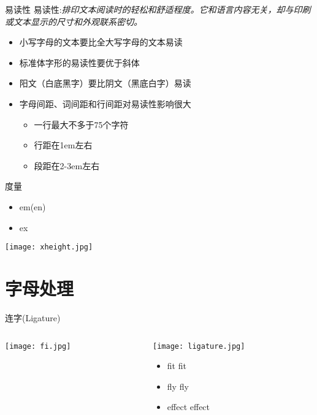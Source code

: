 ﻿\documentclass[hyperref={bookmarks=true},xcolor=pdflatex,svgnames,table,compress]{beamer}
\begin{document}
\begin{frame}{易读性}
  易读性:{\em 排印文本阅读时的轻松和舒适程度。它和语言内容无关，却与印刷或文本显示的尺寸和外观联系密切。}

  \begin{itemize}
  \item<1-> 小写字母的文本要比全大写字母的文本易读
  \item<1-> 标准体字形的易读性要优于斜体
  \item<1-> 阳文（白底黑字）要比阴文（黑底白字）易读
  \item<2-> 字母间距、词间距和行间距对易读性影响很大
    \begin{itemize}
    \item 一行最大不多于75个字符
    \item 行距在1em左右
    \item 段距在2-3em左右
    \end{itemize}
  \end{itemize}

\end{frame}

\begin{frame}{度量}

  \begin{itemize}
  \item em(en)
  \item ex
  \end{itemize}

  \texttt{[image: xheight.jpg]}
\end{frame}

\section{字母处理}
\begin{frame}{连字(Ligature)}
  \begin{columns}[c]

    \begin{column}{0.2\textwidth}

      \texttt{[image: fi.jpg]}

    \end{column}

    \begin{column}{0.8\textwidth}
      \texttt{[image: ligature.jpg]}

      {\Huge
        \begin{itemize}
        \item fit \textrm{fit} 
        \item fly \textrm{fly}
        \item effect \textrm{effect}
        \end{itemize}
      }
    \end{column}

  \end{columns}

\end{frame}
\end{document}
